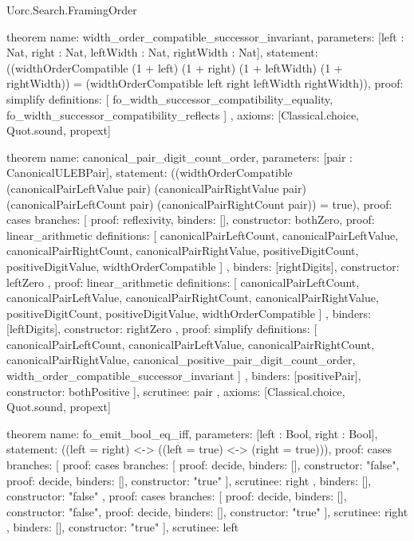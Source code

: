 \begin{lexlean}{Uorc.Search.FramingOrder}
\begin{semanticmodule}
theorem{
  name: width_order_compatible_successor_invariant,
  parameters: [left : Nat, right : Nat, leftWidth : Nat, rightWidth : Nat],
  statement: ((widthOrderCompatible (1 + left) (1 + right) (1 + leftWidth) (1 + rightWidth)) = (widthOrderCompatible left right leftWidth rightWidth)),
  proof: simplify{
    definitions: [
      fo_width_successor_compatibility_equality,
      fo_width_successor_compatibility_reflects
    ]
  },
  axioms: [Classical.choice, Quot.sound, propext]
}

theorem{
  name: canonical_pair_digit_count_order,
  parameters: [pair : CanonicalULEBPair],
  statement: ((widthOrderCompatible (canonicalPairLeftValue pair) (canonicalPairRightValue pair) (canonicalPairLeftCount pair) (canonicalPairRightCount pair)) = true),
  proof: cases{
    branches: [
      {proof: reflexivity{}, binders: [], constructor: bothZero},
      {
        proof: linear_arithmetic{
          definitions: [
            canonicalPairLeftCount,
            canonicalPairLeftValue,
            canonicalPairRightCount,
            canonicalPairRightValue,
            positiveDigitCount,
            positiveDigitValue,
            widthOrderCompatible
          ]
        },
        binders: [rightDigits],
        constructor: leftZero
      },
      {
        proof: linear_arithmetic{
          definitions: [
            canonicalPairLeftCount,
            canonicalPairLeftValue,
            canonicalPairRightCount,
            canonicalPairRightValue,
            positiveDigitCount,
            positiveDigitValue,
            widthOrderCompatible
          ]
        },
        binders: [leftDigits],
        constructor: rightZero
      },
      {
        proof: simplify{
          definitions: [
            canonicalPairLeftCount,
            canonicalPairLeftValue,
            canonicalPairRightCount,
            canonicalPairRightValue,
            canonical_positive_pair_digit_count_order,
            width_order_compatible_successor_invariant
          ]
        },
        binders: [positivePair],
        constructor: bothPositive
      }
    ],
    scrutinee: pair
  },
  axioms: [Classical.choice, Quot.sound, propext]
}

theorem{
  name: fo_emit_bool_eq_iff,
  parameters: [left : Bool, right : Bool],
  statement: ((left = right) <-> ((left = true) <-> (right = true))),
  proof: cases{
    branches: [
      {
        proof: cases{
          branches: [
            {proof: decide{}, binders: [], constructor: "false"},
            {proof: decide{}, binders: [], constructor: "true"}
          ],
          scrutinee: right
        },
        binders: [],
        constructor: "false"
      },
      {
        proof: cases{
          branches: [
            {proof: decide{}, binders: [], constructor: "false"},
            {proof: decide{}, binders: [], constructor: "true"}
          ],
          scrutinee: right
        },
        binders: [],
        constructor: "true"
      }
    ],
    scrutinee: left
  }
}


\end{semanticmodule}
\end{lexlean}
